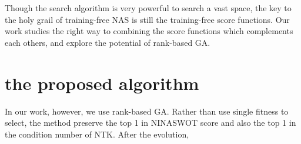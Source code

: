 \documentclass[sigconf]{acmart}
\begin{document}
    Though the search algorithm is very powerful to search a vast space, the key to the holy 
    grail of training-free NAS is still the training-free score functions. Our work studies 
    the right way to combining the score functions which complements each others, and explore 
    the potential of rank-based GA.

    \section{the proposed algorithm}
    In our work, however, we use rank-based GA. Rather than use single fitness to select, 
    the method preserve the top 1 in NINASWOT score and also the top 1 in the condition 
    number of NTK. After the evolution, 

    
    
\end{document}
